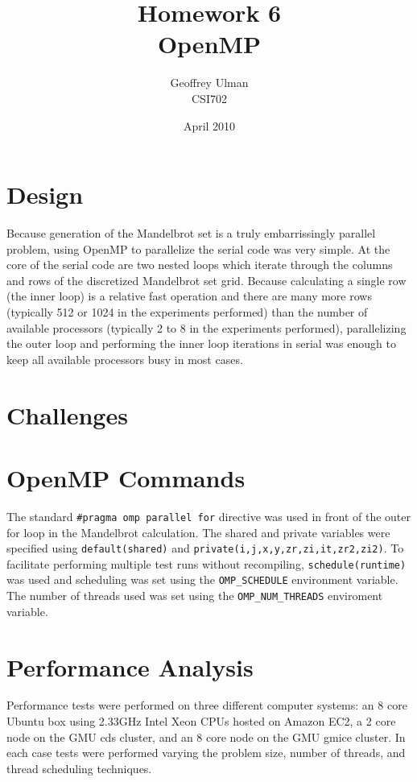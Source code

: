 \documentclass{article}
\begin{document}
\title{Homework 6\\
       OpenMP}
\author{Geoffrey Ulman\\
        CSI702}
\date{April 2010}
\maketitle

\section{Design}
Because generation of the Mandelbrot set is a truly embarrissingly parallel problem, using OpenMP to parallelize the serial code was very simple. At the core of the serial code are two nested loops which iterate through the columns and rows of the discretized Mandelbrot set grid. Because calculating a single row (the inner loop) is a relative fast operation and there are many more rows (typically 512 or 1024 in the experiments performed) than the number of available processors (typically 2 to 8 in the experiments performed), parallelizing the outer loop and performing the inner loop iterations in serial was enough to keep all available processors busy in most cases.

\section{Challenges}


\section{OpenMP Commands}
The standard \verb!#pragma omp parallel for! directive was used in front of the outer for loop in the Mandelbrot calculation. The shared and private variables were specified using \verb!default(shared)! and \verb!private(i,j,x,y,zr,zi,it,zr2,zi2)!. To facilitate performing multiple test runs without recompiling, \verb!schedule(runtime)! was used and scheduling was set using the \verb!OMP_SCHEDULE! environment variable. The number of threads used was set using the \verb!OMP_NUM_THREADS! enviroment variable.

\section{Performance Analysis}

Performance tests were performed on three different computer systems: an 8 core Ubuntu box using 2.33GHz Intel Xeon CPUs hosted on Amazon EC2, a 2 core node on the GMU cds cluster, and an 8 core node on the GMU gmice cluster. In each case tests were performed varying the problem size, number of threads, and thread scheduling techniques.
\end{document}
